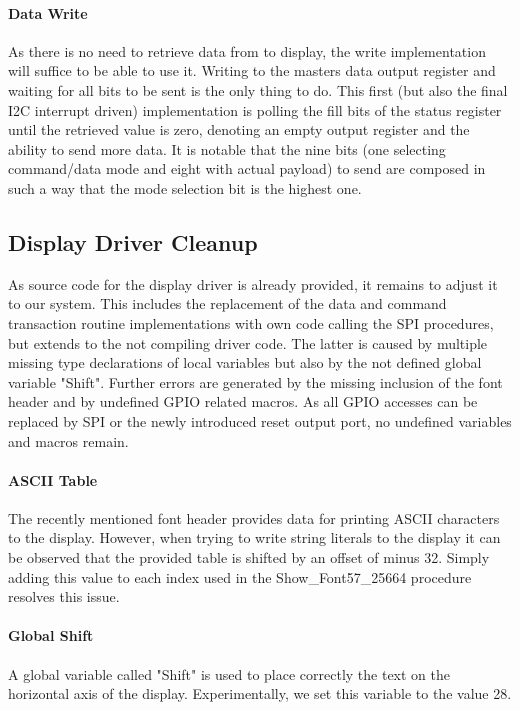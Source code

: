 	   		\paragraph{Data Write} %
	   		\label{par:data_write}
	   			As there is no need to retrieve data from to display, the write implementation will suffice to be able to use it. Writing to the masters data output register and waiting for all bits to be sent is the only thing to do. This first (but also the final I2C interrupt driven) implementation is polling the fill bits of the status register until the retrieved value is zero, denoting an empty output register and the ability to send more data.
	   			It is notable that the nine bits (one selecting command/data mode and eight with actual payload) to send are composed in such a way that the mode selection bit is the highest one.

		\subsection{Display Driver Cleanup} %
		\label{sub:impl_display_driver_cleanup}
			As source code for the display driver is already provided, it remains to adjust it to our system. This includes the replacement of the data and command transaction routine implementations with own code calling the SPI procedures, but extends to the not compiling driver code. The latter is caused by multiple missing type declarations of local variables but also by the not defined global variable "Shift". Further errors are generated by the missing inclusion of the font header and by undefined GPIO related macros. As all GPIO accesses can be replaced by SPI or the newly introduced reset output port, no undefined variables and macros remain.

			\paragraph{ASCII Table} %
			\label{par:ascii_table}
				The recently mentioned font header provides data for printing ASCII characters to the display. However, when trying to write string literals to the display it can be observed that the provided table is shifted by an offset of minus \num{32}. Simply adding this value to each index used in the Show\_Font57\_25664 procedure resolves this issue.

			\paragraph{Global Shift} %
			\label{par:global_shift}
				A global variable called "Shift" is used to place correctly the text on the horizontal axis of the display. Experimentally, we set this variable to the value \num{28}. 

